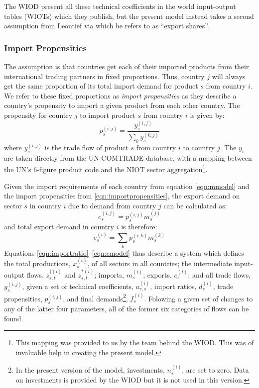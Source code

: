 \documentclass[a4paper]{article}
\begin{document}
The WIOD present all these technical coefficients in the world input-output tables (WIOTs) which they publish, but the present model instead takes a second assumption from Leontief via \textcite{duchin_international_2004} which he refers to as ``export shares''.

\subsubsection*{Import Propensities}
The assumption is that countries get each of their imported products from their international trading partners in fixed proportions.
Thus, country $j$ will always get the same proportion of its total import demand for product $s$ from country $i$.
We refer to these fixed proportions as \textit{import propensities} as they describe a country's propensity to import a given product from each other country.
The propensity for country $j$ to import product $s$ from country $i$ is given by:
\begin{equation}\label{eqn:importpropensities}
p^{(i,j)}_s = \frac{y^{(i,j)}_s}{\sum_k{y^{(k,j)}_s}}
\end{equation}
where $y^{(i,j)}_s$ is the trade flow of product $s$ from country $i$ to country $j$. The $y_s$ are taken directly from the UN COMTRADE database, with a mapping between the UN's 6-figure product code and the NIOT sector aggregation\footnote{This mapping was provided to us by the team behind the WIOD. This was of invaluable help in creating the present model.}.

Given the import requirements of each country from equation \eqref{eqn:mmodel} and the import propensities from \eqref{eqn:importpropensities}, the export demand on sector $s$ in country $i$ due to demand from country $j$ can be calculated as:
\begin{equation*}
e_s^{(i,j)} = p_s^{(i,j)}m_s^{(j)}
\end{equation*}
and total export demand in country $i$ is therefore:
\begin{equation}\label{eqn:emodel}
e_s^{(i)} = \sum_k{p_s^{(i,k)}m_s^{(k)}}
\end{equation}
\noindent Equations \eqref{eqn:importratio}--\eqref{eqn:emodel} thus describe a system which defines the total productions, $x_s^{(i)}$, of all sectors in all countries; the intermediate input-output flows, $z_{s,t}^{\dagger(i)}$ and $z_{s,t}^{*(i)}$; imports, $m_s^{(i)}$; exports, $e_s^{(i)}$; and all trade flows, $y_s^{(i,j)}$, given a set of technical coefficients, $a_{r,s}^{(i)}$, import ratios, $d_s^{(i)}$, trade propensities, $p_s^{(i,j)}$, and final demands\footnote{In the present version of the model, investments, $n_s^{(i)}$, are set to zero. 
Data on investments is provided by the WIOD but it is not used in this version.}, $f_s^{(i)}$. Folowing a given set of changes to any of the latter four parameters, all of the former six categories of flows can be found.
\end{document}
